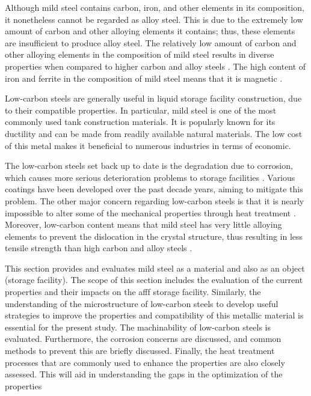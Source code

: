 Although mild steel contains carbon, iron, and other elements in its composition, it nonetheless cannot be regarded as alloy steel. This is due to the extremely low amount of carbon and other alloying elements it contains; thus, these elements are insufficient to produce alloy steel. The relatively low amount of carbon and other alloying elements in the composition of mild steel results in diverse properties when compared to higher carbon and alloy steels \cite{timings2008fabrication}. The high content of iron and ferrite in the composition of mild steel means that it is magnetic \cite{li2018effect}.

Low-carbon steels are generally useful in liquid storage facility construction, due to their compatible properties. In particular, mild steel is one of the most commonly used tank construction materials. It is popularly known for its ductility and can be made from readily available natural materials. The low cost of this metal makes it beneficial to numerous industries in terms of economic.

The low-carbon steels set back up to date is the degradation due to corrosion, which causes more serious deterioration problems to storage facilities \cite{erami2019carboxamide}. Various coatings have been developed over the past decade years, aiming to mitigate this problem. The other major concern regarding low-carbon steels is that it is nearly impossible to alter some of the mechanical properties through heat treatment \cite{callister2018materials}. Moreover, low-carbon content means that mild steel has very little alloying elements to prevent the dislocation in the crystal structure, thus resulting in less tensile strength than high carbon and alloy steels \cite{callister2018materials}.

This section provides and evaluates mild steel as a material and also as an object (storage facility). The scope of this section includes the evaluation of the current properties and their impacts on the \acrshort{afff} storage facility. Similarly, the understanding of the microstructure of low-carbon steels to develop useful strategies to improve the properties and compatibility of this metallic material is essential for the present study. The machinability of low-carbon steels is evaluated. Furthermore, the corrosion concerns are discussed, and common methods to prevent this are briefly discussed. Finally, the heat treatment processes that are commonly used to enhance the properties are also closely assessed. This will aid in understanding the gaps in the optimization of the properties

